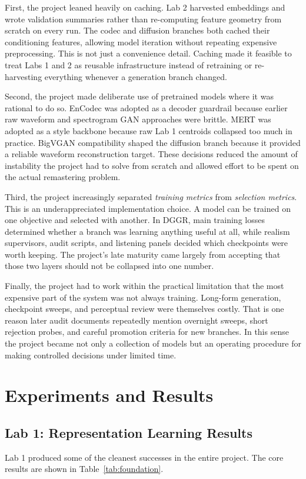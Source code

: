 \documentclass[conference]{IEEEtran}
\begin{document}
First, the project leaned heavily on caching. Lab 2 harvested embeddings and wrote validation summaries rather than re-computing feature geometry from scratch on every run. The codec and diffusion branches both cached their conditioning features, allowing model iteration without repeating expensive preprocessing. This is not just a convenience detail. Caching made it feasible to treat Labs 1 and 2 as reusable infrastructure instead of retraining or re-harvesting everything whenever a generation branch changed.

Second, the project made deliberate use of pretrained models where it was rational to do so. EnCodec was adopted as a decoder guardrail because earlier raw waveform and spectrogram GAN approaches were brittle. MERT was adopted as a style backbone because raw Lab 1 centroids collapsed too much in practice. BigVGAN compatibility shaped the diffusion branch because it provided a reliable waveform reconstruction target. These decisions reduced the amount of instability the project had to solve from scratch and allowed effort to be spent on the actual remastering problem.

Third, the project increasingly separated \emph{training metrics} from \emph{selection metrics}. This is an underappreciated implementation choice. A model can be trained on one objective and selected with another. In DGGR, main training losses determined whether a branch was learning anything useful at all, while realism supervisors, audit scripts, and listening panels decided which checkpoints were worth keeping. The project's late maturity came largely from accepting that those two layers should not be collapsed into one number.

Finally, the project had to work within the practical limitation that the most expensive part of the system was not always training. Long-form generation, checkpoint sweeps, and perceptual review were themselves costly. That is one reason later audit documents repeatedly mention overnight sweeps, short rejection probes, and careful promotion criteria for new branches. In this sense the project became not only a collection of models but an operating procedure for making controlled decisions under limited time.

\section{Experiments and Results}
\subsection{Lab 1: Representation Learning Results}
Lab 1 produced some of the cleanest successes in the entire project. The core results are shown in Table~\ref{tab:foundation}.
\end{document}
